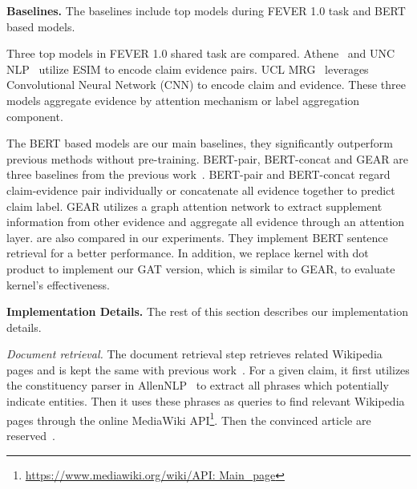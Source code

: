 \documentclass[11pt,a4paper]{article}
\begin{document}
\textbf{Baselines.}
The baselines include top models during FEVER 1.0 task and BERT based models.

Three top models in FEVER 1.0 shared task are compared. Athene~\cite{hanselowski2018ukp} and UNC NLP~\cite{nie2019combining} utilize ESIM to encode claim evidence pairs. UCL MRG~\cite{yoneda2018ucl} leverages Convolutional Neural Network (CNN) to encode claim and evidence. These three models aggregate evidence by attention mechanism or label aggregation component.

The BERT based models are our main baselines, they significantly outperform previous methods without pre-training. BERT-pair, BERT-concat and GEAR are three baselines from the previous work~\cite{zhou2019gear}. BERT-pair and BERT-concat regard claim-evidence pair individually or concatenate all evidence together to predict claim label. GEAR utilizes a graph attention network to extract supplement information from other evidence and aggregate all evidence through an attention layer.
\citet{soleimani2019bert, nie2019revealing} are also compared in our experiments. They implement BERT sentence retrieval for a better performance.  
In addition, we replace kernel with dot product to implement our GAT version, which is similar to GEAR, to evaluate kernel's effectiveness.

\begin{table}[t]
	\begin{center}
		\caption{\label{tab:dataset}Statistics of FEVER Dataset.}
	\end{center}
\end{table}

\textbf{Implementation Details.} The rest of this section describes our implementation details. 

\textit{Document retrieval.} The document retrieval step retrieves related Wikipedia pages and is kept the same with previous work~\cite{hanselowski2018ukp,zhou2019gear,soleimani2019bert}. For a given claim, it first utilizes the constituency parser in AllenNLP~\cite{gardner2018allennlp} to extract all phrases which potentially indicate entities. Then it uses these phrases as queries to find relevant Wikipedia pages through the online MediaWiki API\footnote{\url{https://www.mediawiki.org/wiki/API: Main_page}}. Then the convinced article are reserved~\cite{hanselowski2018ukp}.
\end{document}
